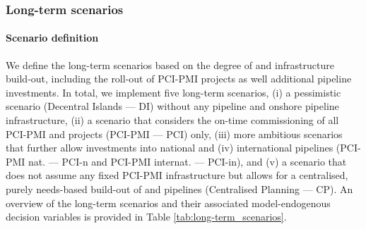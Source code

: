 \documentclass[preprint,12pt,sort&compress]{elsarticle}
\begin{document}
\subsubsection{Long-term scenarios}
\paragraph{Scenario definition}
\label{sec:definition}
We define the long-term scenarios based on the degree of  and  infrastructure build-out, including the roll-out of PCI-PMI projects as well additional pipeline investments. In total, we implement five long-term scenarios, (i) a pessimistic scenario (Decentral Islands --- DI) without any  pipeline and onshore  pipeline infrastructure, (ii) a scenario that considers the on-time commissioning of all PCI-PMI  and  projects (PCI-PMI --- PCI) only, (iii) more ambitious scenarios that further allow investments into national and (iv) international pipelines (PCI-PMI nat. --- PCI-n and PCI-PMI internat. --- PCI-in), and (v) a scenario that does not assume any fixed PCI-PMI infrastructure but allows for a centralised, purely needs-based build-out of  and  pipelines (Centralised Planning --- CP). An overview of the long-term scenarios and their associated model-endogenous decision variables is provided in Table \ref{tab:long-term_scenarios}. 
\end{document}
